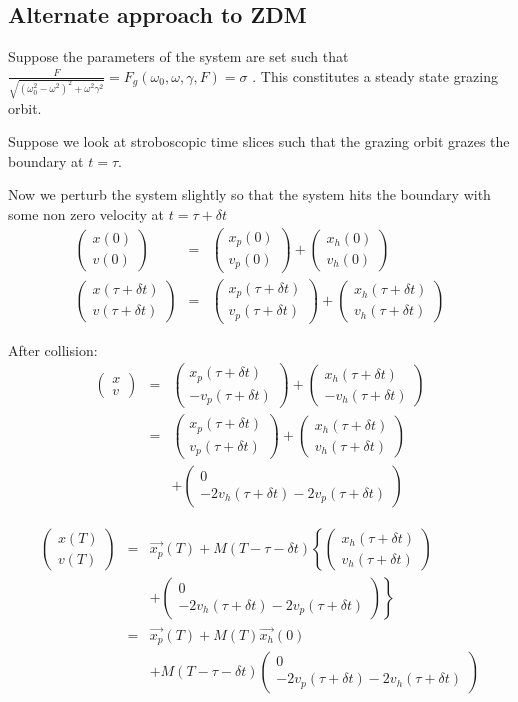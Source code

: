 \documentclass[xcolor=x11names,compress]{beamer}
\renewcommand{\(}{\begin{columns}}
\renewcommand{\)}{\end{columns}}
\newcommand{\<}[1]{\begin{column}{#1}}
\renewcommand{\>}{\end{column}}
\newcommand{\colv}[2]{\begin{pmatrix}#1\\#2\end{pmatrix}}
\begin{document}
\begin{frame}
\section{Alternate approach to ZDM}
Suppose the parameters of the system are set such that 
$\frac{F}{\sqrt{(\omega_0^2-\omega^2)^2+\omega^2\gamma^2}}=F_g(\omega_0,\omega,\gamma,F)=\sigma$
. This constitutes a steady state grazing orbit.  \\
 \vspace{1em}

Suppose we look at stroboscopic time slices such that the grazing orbit grazes 
the boundary at $t=\tau$.  \\
\vspace{1em}

Now we perturb the system slightly so that the system hits the boundary with 
some non zero velocity at $t=\tau+\delta t$\\

\begin{eqnarray*}
\colv{x(0)}{v(0)}&=&\colv{x_p(0)}{v_p(0)}+\colv{x_h(0)}{v_h(0)}\\
\colv{x(\tau+\delta t)}{v(\tau+\delta t)}&=&\colv{x_p(\tau+\delta t)}{v_p(\tau+\delta t)}+\colv{x_h(\tau+\delta t)}{v_h(\tau+\delta t)}
\end{eqnarray*}
\end{frame}

\begin{frame}[label=BackFromM]
After collision:\\
\begin{eqnarray*}
\colv{x}{v}&=&\colv{x_p(\tau+\delta t)}{-v_p(\tau+\delta t)}+\colv{x_h(\tau+\delta t)}{-v_h(\tau+\delta t)}\\
&=&\colv{x_p(\tau+\delta t)}{v_p(\tau+\delta t)}+\colv{x_h(\tau+\delta t)}{v_h(\tau+\delta t)}\\
&&+\colv{0}{-2v_h(\tau+\delta t)-2v_p(\tau+\delta t)}
\end{eqnarray*}

\begin{eqnarray*}
\colv{x(T)}{v(T)}&=&\vec{x_p}(T)+M(T-\tau-\delta 
t)\left\{\colv{x_h(\tau+\delta t)}{v_h(\tau+\delta t)}\right.\\
&&\left.+\colv{0}{-2v_h(\tau+\delta t)-2v_p(\tau+\delta t)}\right\}\\
&=&\vec{x_p}(T)+M(T)\vec{x_h}(0)\\&&+M(T-\tau-\delta t)\colv{0}{-2v_p(\tau+\delta t)-2v_h(\tau+\delta t)}
\end{eqnarray*}
\hyperlink{homogen-evol}{}

\end{frame}
\end{document}
